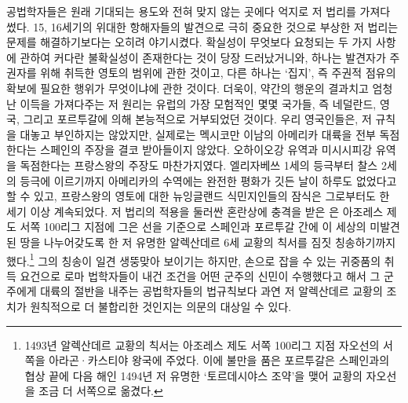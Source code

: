 공법학자들은
원래 기대되는 용도와 전혀 맞지 않는 곳에다 억지로
저 법리를
가져다 썼다.
15, 16세기의 위대한 항해자들의 발견으로 극히 중요한 것으로 부상한
저 법리는
문제를 해결하기보다는 오히려 야기시켰다.
확실성이 무엇보다 요청되는 두 가지 사항에 관하여
커다란 불확실성이 존재한다는 것이 당장 드러났거니와,
하나는 발견자가 주권자를 위해 취득한 영토의 범위에 관한 것이고,
다른 하나는 `집지',
즉 주권적 점유의 확보에
필요한 행위가 무엇이냐에
관한 것이다.
더욱이,
약간의 행운의 결과치고 엄청난 이득을 가져다주는 저 원리는
유럽의 가장 모험적인 몇몇 국가들, 즉 네덜란드, 영국, 그리고 포르투갈에 의해
본능적으로 거부되었던 것이다.
우리 영국인들은,
저  규칙을 대놓고 부인하지는 않았지만,
실제로는
멕시코만 이남의 아메리카 대륙을 전부 독점한다는 스페인의 주장을
결코 받아들이지 않았다.
오하이오강 유역과 미시시피강 유역을 독점한다는 프랑스왕의 주장도 마찬가지였다.
엘리자베쓰 1세의 등극부터 찰스 2세의 등극에 이르기까지
아메리카의 수역에는 완전한 평화가 깃든 날이
하루도 없었다고 할 수 있고,
프랑스왕의 영토에 대한
뉴잉글랜드 식민지인들의
잠식은
그로부터도 한 세기 이상 계속되었다.
저 법리의 적용을 둘러싼 혼란상에 충격을 받은 은
아조레스 제도 서쪽 100리그 지점에 그은 선을 기준으로
스페인과 포르투갈 간에
이 세상의 미발견된 땅을
나누어갖도록 한
저 유명한 알렉산데르 6세 교황의 칙서를 짐짓 칭송하기까지 했다.\footnote{%
  1493년 알렉산데르 교황의 칙서는
  아조레스 제도 서쪽 100리그 지점 자오선의 서쪽을
  아라곤^^b7카스티야 왕국에 주었다.
  이에 불만을 품은 포르투갈은 스페인과의 협상 끝에
  다음 해인 1494년 저 유명한 `토르데시야스 조약'을 맺어
  교황의 자오선을 조금 더 서쪽으로 옮겼다.
  }
그의 칭송이 일견 생뚱맞아 보이기는 하지만,
손으로 잡을 수 있는 귀중품의 취득 요건으로
로마 법학자들이 내건 조건을
어떤 군주의 신민이
수행했다고 해서 그 군주에게
대륙의 절반을 내주는 공법학자들의 법규칙보다
과연
저 알렉산데르 교황의 조치가
원칙적으로 더 불합리한 것인지는 의문의 대상일 수 있다.

